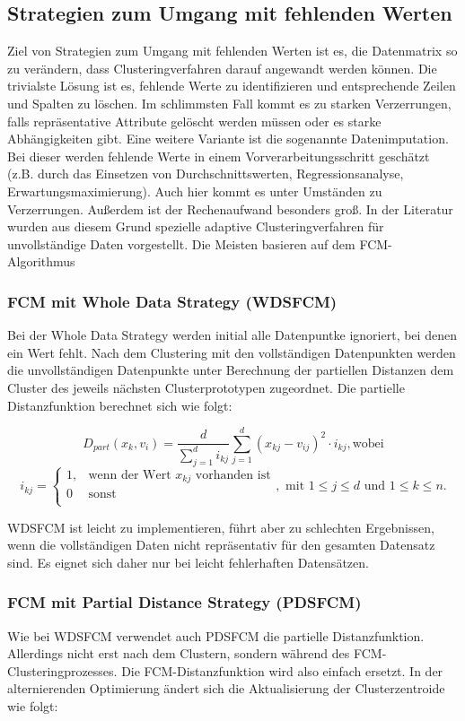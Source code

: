 \documentclass[11pt,ceqn]{book}
\begin{document}
\subsection{Strategien zum Umgang mit fehlenden Werten}
Ziel von Strategien zum Umgang mit fehlenden Werten ist es, die Datenmatrix so zu verändern, dass Clusteringverfahren darauf angewandt werden können. Die trivialste Lösung ist es, fehlende Werte zu identifizieren und entsprechende Zeilen und Spalten zu löschen. Im schlimmsten Fall kommt es zu starken Verzerrungen, falls repräsentative Attribute gelöscht werden müssen oder es starke Abhängigkeiten gibt. Eine weitere Variante ist die sogenannte Datenimputation. Bei dieser werden fehlende Werte in einem Vorverarbeitungsschritt geschätzt (z.B. durch das Einsetzen von Durchschnittswerten, Regressionsanalyse, Erwartungsmaximierung). Auch hier kommt es unter Umständen zu Verzerrungen. Außerdem ist der Rechenaufwand besonders groß. In der Literatur wurden aus diesem Grund spezielle adaptive Clusteringverfahren für unvollständige Daten vorgestellt. Die Meisten basieren auf dem FCM-Algorithmus

\subsubsection{FCM mit Whole Data Strategy (WDSFCM)}
Bei der Whole Data Strategy \cite{wdsfcm} werden initial alle Datenpuntke ignoriert, bei denen ein Wert fehlt. Nach dem Clustering mit den vollständigen Datenpunkten werden die unvollständigen Datenpunkte unter Berechnung der partiellen Distanzen dem Cluster des jeweils nächsten Clusterprototypen zugeordnet. Die partielle Distanzfunktion berechnet sich wie folgt:

$$D_{part}(x_k,v_i) = \frac{d}{\sum\limits_{j=1}^d i_{kj}} \sum\limits_{j=1}^d (x_{kj}-v_{ij})^2 \cdot i_{kj}, \text{wobei}$$
$$i_{kj} = \begin{cases}
1, & \text{wenn der Wert } x_{kj} \text{ vorhanden ist} \\
0 & \textrm{sonst} \\
\end{cases}, \text{ mit } 1\leqslant j\leqslant d \text{ und } 1\leqslant k \leqslant n.$$

WDSFCM ist leicht zu implementieren, führt aber zu schlechten Ergebnissen, wenn die vollständigen Daten nicht repräsentativ für den gesamten Datensatz sind. Es eignet sich daher nur bei leicht fehlerhaften Datensätzen.

\subsubsection{FCM mit Partial Distance Strategy (PDSFCM)}
Wie bei WDSFCM verwendet auch PDSFCM \cite{wdsfcm}\cite{pdsfcm} die partielle Distanzfunktion. Allerdings nicht erst nach dem Clustern, sondern während des FCM-Clusteringprozesses. Die FCM-Distanzfunktion wird also einfach ersetzt. In der alternierenden Optimierung ändert sich die Aktualisierung der Clusterzentroide wie folgt:
\end{document}
